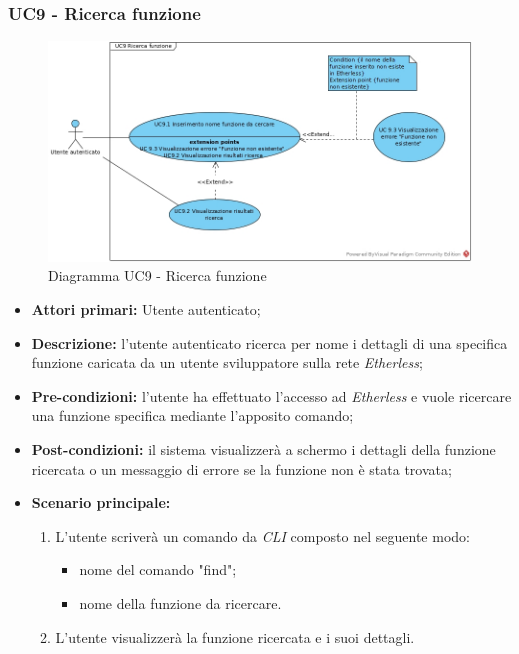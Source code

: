 \subsubsection{UC9 - Ricerca funzione}
\begin{figure}[h]
	\centering
	\includegraphics[width=\linewidth]{res/img/UC9.jpg}
	\caption{Diagramma UC9 - Ricerca funzione}
\end{figure}
\begin{itemize}
	\item \textbf{Attori primari:} Utente autenticato;
	\item \textbf{Descrizione:} l'utente autenticato ricerca per nome i dettagli di una specifica funzione caricata da un utente sviluppatore sulla rete \textit{Etherless};
	\item \textbf{Pre-condizioni:} l'utente ha effettuato l'accesso ad \textit{Etherless} e vuole ricercare una funzione specifica mediante l'apposito comando;
	\item \textbf{Post-condizioni:} il sistema visualizzerà a schermo i dettagli della funzione ricercata o un messaggio di errore se la funzione non è stata trovata;
	\item \textbf{Scenario principale:}
	\begin{enumerate}
		\item L'utente scriverà un comando da \textit{CLI\glos} composto nel seguente modo:
		\begin{itemize}
			\item nome del comando "find";
			\item nome della funzione da ricercare.
		\end{itemize}
        \item L'utente visualizzerà la funzione ricercata e i suoi dettagli.
	\end{enumerate}
\end{itemize}
